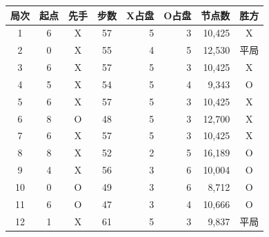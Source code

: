 \begin{tabular}{ccccrrrc}
\toprule
局次 & 起点 & 先手 & 步数 & X占盘 & O占盘 & 节点数 & 胜方 \\
\midrule
1 & 6 & X & 57 & 5 & 3 & 10,425 & X \\
2 & 0 & X & 55 & 4 & 5 & 12,530 & 平局 \\
3 & 6 & X & 57 & 5 & 3 & 10,425 & X \\
4 & 5 & X & 54 & 5 & 4 & 9,343 & O \\
5 & 6 & X & 57 & 5 & 3 & 10,425 & X \\
6 & 8 & O & 48 & 5 & 3 & 12,700 & X \\
7 & 6 & X & 57 & 5 & 3 & 10,425 & X \\
8 & 8 & X & 52 & 2 & 5 & 16,189 & O \\
9 & 4 & X & 56 & 3 & 6 & 10,004 & O \\
10 & 0 & O & 49 & 3 & 6 & 8,712 & O \\
11 & 6 & O & 47 & 3 & 4 & 10,666 & O \\
12 & 1 & X & 61 & 5 & 3 & 9,837 & 平局 \\
\bottomrule
\end{tabular}
